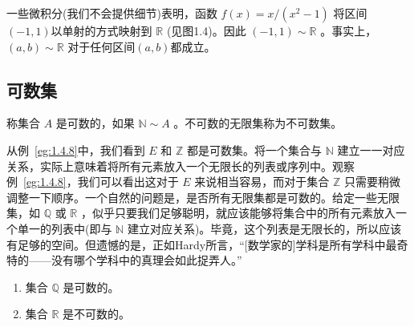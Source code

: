 \begin{Eg}
  \label{eg:1.4.9}
一些微积分(我们不会提供细节)表明，函数 \(f\left( x\right)  = x/\left( {{x}^{2} - 1}\right)\) 将区间$(-1,1)$以单射的方式映射到 \(\mathbb{R}\) (见图1.4)。因此 \(\left( {-1,1}\right)  \sim  \mathbb{R}\) 。事实上， \(\left( {a,b}\right)  \sim  \mathbb{R}\) 对于任何区间$(a, b)$都成立。  
\end{Eg}

\subsection{可数集}
\begin{Def}
  \label{def:1.4.10}
称集合 \(A\) 是可数的，如果 \(\mathbb{N} \sim  A\) 。不可数的无限集称为不可数集。  
\end{Def}

从例~\ref{eg:1.4.8}中，我们看到 \(E\) 和 \(\mathbb{Z}\) 都是可数集。将一个集合与 \(\mathbb{N}\) 建立一一对应关系，实际上意味着将所有元素放入一个无限长的列表或序列中。观察例~\ref{eg:1.4.8}，我们可以看出这对于 \(E\) 来说相当容易，而对于集合 \(\mathbb{Z}\) 只需要稍微调整一下顺序。一个自然的问题是，是否所有无限集都是可数的。给定一些无限集，如 \(\mathbb{Q}\) 或 \(\mathbb{R}\) ，似乎只要我们足够聪明，就应该能够将集合中的所有元素放入一个单一的列表中(即与 \(\mathbb{N}\) 建立对应关系)。毕竟，这个列表是无限长的，所以应该有足够的空间。但遗憾的是，正如Hardy所言，“[数学家的]学科是所有学科中最奇特的——没有哪个学科中的真理会如此捉弄人。”

\begin{Thm}
  \label{thm:1.4.11}
\begin{enumerate}[label = (\roman*)]
\item\label{item:1.4.3} 集合 \(\mathbb{Q}\) 是可数的。 
\item\label{item:1.4.4} 集合 \(\mathbb{R}\) 是不可数的。
\end{enumerate}  
\end{Thm}

